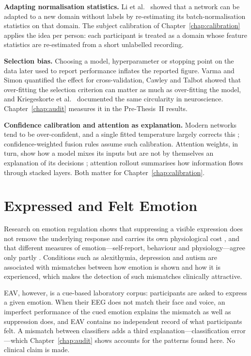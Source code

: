 \textbf{Adapting normalisation statistics.} Li et al.\ \cite{Li2016AdaBN} showed that a network can be adapted to a new domain without labels by re-estimating its batch-normalisation statistics on that domain. The subject calibration of Chapter~\ref{chap:calibration} applies the idea per person: each participant is treated as a domain whose feature statistics are re-estimated from a short unlabelled recording.

\textbf{Selection bias.} Choosing a model, hyperparameter or stopping point on the data later used to report performance inflates the reported figure. Varma and Simon \cite{Varma2006CVBias} quantified the effect for cross-validation, Cawley and Talbot \cite{Cawley2010Overfitting} showed that over-fitting the selection criterion can matter as much as over-fitting the model, and Kriegeskorte et al.\ \cite{Kriegeskorte2009DoubleDipping} documented the same circularity in neuroscience. Chapter~\ref{chap:audit} measures it in the Pre-Thesis~II results.

\textbf{Confidence calibration and attention as explanation.} Modern networks tend to be over-confident, and a single fitted temperature largely corrects this \cite{Guo2017Calibration}; confidence-weighted fusion rules assume such calibration. Attention weights, in turn, show how a model mixes its inputs but are not by themselves an explanation of its decisions \cite{Jain2019AttentionNot}; attention rollout \cite{Abnar2020Rollout} summarises how information flows through stacked layers. Both matter for Chapter~\ref{chap:calibration}.

\section{Expressed and Felt Emotion}
Research on emotion regulation shows that suppressing a visible expression does not remove the underlying response and carries its own physiological cost \cite{Gross1998EmotionRegulation}, and that different measures of emotion---self-report, behaviour and physiology---agree only partly \cite{Mauss2009Measures}. Conditions such as alexithymia, depression and autism are associated with mismatches between how emotion is shown and how it is experienced, which makes the detection of such mismatches clinically attractive.

EAV, however, is a cue-based laboratory corpus: participants are asked to express a given emotion. When their EEG does not match their face and voice, an imperfect performance of the cued emotion explains the mismatch as well as suppression does, and EAV contains no independent record of what participants felt. A mismatch between classifiers adds a third explanation---classification error---which Chapter~\ref{chap:audit} shows accounts for the patterns found here. No clinical claim is made.

